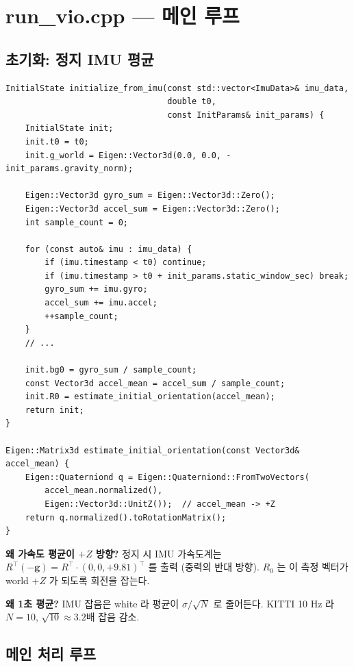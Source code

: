 \documentclass[11pt,a4paper,oneside]{report}
\newcommand{\T}{^{\!\top}}
\begin{document}
\section{run\_vio.cpp — 메인 루프}

\subsection{초기화: 정지 IMU 평균}

\begin{lstlisting}[style=cpp,caption={\texttt{apps/run\_vio.cpp:96-155}, 발췌}]
InitialState initialize_from_imu(const std::vector<ImuData>& imu_data,
                                 double t0,
                                 const InitParams& init_params) {
    InitialState init;
    init.t0 = t0;
    init.g_world = Eigen::Vector3d(0.0, 0.0, -init_params.gravity_norm);

    Eigen::Vector3d gyro_sum = Eigen::Vector3d::Zero();
    Eigen::Vector3d accel_sum = Eigen::Vector3d::Zero();
    int sample_count = 0;

    for (const auto& imu : imu_data) {
        if (imu.timestamp < t0) continue;
        if (imu.timestamp > t0 + init_params.static_window_sec) break;
        gyro_sum += imu.gyro;
        accel_sum += imu.accel;
        ++sample_count;
    }
    // ...

    init.bg0 = gyro_sum / sample_count;
    const Vector3d accel_mean = accel_sum / sample_count;
    init.R0 = estimate_initial_orientation(accel_mean);
    return init;
}

Eigen::Matrix3d estimate_initial_orientation(const Vector3d& accel_mean) {
    Eigen::Quaterniond q = Eigen::Quaterniond::FromTwoVectors(
        accel_mean.normalized(),
        Eigen::Vector3d::UnitZ());  // accel_mean -> +Z
    return q.normalized().toRotationMatrix();
}
\end{lstlisting}

\textbf{왜 가속도 평균이 \(+Z\) 방향?} 정지 시 IMU 가속도계는 \(R\T(-\bm{g}) = R\T \cdot (0, 0, +9.81)\T\) 를 출력 (중력의 반대 방향). \(R_0\) 는 이 측정 벡터가 world \(+Z\) 가 되도록 회전을 잡는다.

\textbf{왜 1초 평균?} IMU 잡음은 white 라 평균이 \(\sigma / \sqrt{N}\) 로 줄어든다. KITTI 10 Hz 라 \(N=10\), \(\sqrt{10} \approx 3.2\)배 잡음 감소.

\subsection{메인 처리 루프}
\end{document}
